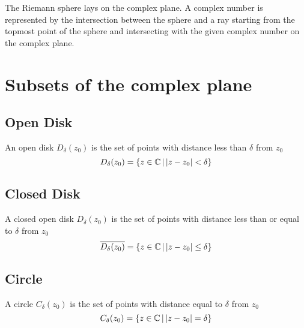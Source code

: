 \documentclass{article}
\begin{document}

The Riemann sphere lays on the complex plane. A complex number
is represented by the intersection between the sphere
and a ray starting from the topmost point of the sphere
and intersecting with the given complex number on the complex plane.

\section{Subsets of the complex plane}

\subsection{Open Disk}

An open disk \(D_\delta(z_0)\) is the set of points
with distance less than \(\delta\) from \(z_0\)
\[
    D_\delta(z_0)=\{z\in \mathbb{C} \,|\, |z-z_0|<\delta\}
\]

\subsection{Closed Disk}

A closed open disk \(D_\delta(z_0)\) is the set of points
with distance less than or equal to \(\delta\) from \(z_0\)
\[
    \overline{D_\delta(z_0)}=\{z\in \mathbb{C} \,|\, |z-z_0|\leq\delta\}
\]

\subsection{Circle}

A circle \(C_\delta(z_0)\) is the set of points
with distance equal to \(\delta\) from \(z_0\)
\[
    C_\delta(z_0)=\{z\in \mathbb{C} \,|\, |z-z_0|=\delta\}
\]
\end{document}
